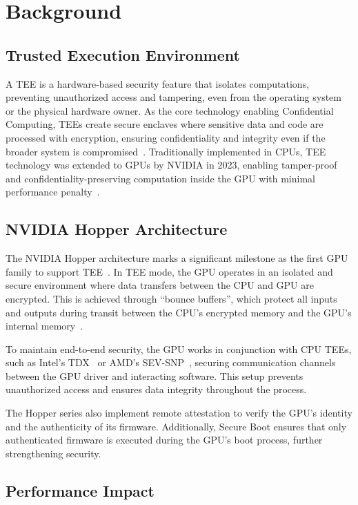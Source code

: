 \documentclass{article}
\begin{document}
\section{Background}

\subsection{Trusted Execution Environment}

A TEE is a hardware-based security feature that isolates computations, preventing unauthorized access and tampering, even from the operating system or the physical hardware owner. As the core technology enabling Confidential Computing, TEEs create secure enclaves where sensitive data and code are processed with encryption, ensuring confidentiality and integrity even if the broader system is compromised~\cite{sabt2015trusted}. Traditionally implemented in CPUs, TEE technology was extended to GPUs by NVIDIA in 2023, enabling tamper-proof and confidentiality-preserving computation inside the GPU with minimal performance penalty~\cite{dhanuskodi2023creating}.

\subsection{NVIDIA Hopper Architecture}

The NVIDIA Hopper architecture marks a significant milestone as the first GPU family to support TEE~\cite{nvidiacc}. In TEE mode, the GPU operates in an isolated and secure environment where data transfers between the CPU and GPU are encrypted. This is achieved through ``bounce buffers'', which protect all inputs and outputs during transit between the CPU’s encrypted memory and the GPU’s internal memory~\cite{dhanuskodi2023creating}.

To maintain end-to-end security, the GPU works in conjunction with CPU TEEs, such as Intel’s TDX~\cite{TDX} or AMD’s SEV-SNP~\cite{SEV-SNP, sev2020strengthening}, securing communication channels between the GPU driver and interacting software. This setup prevents unauthorized access and ensures data integrity throughout the process.

The Hopper series also implement remote attestation to verify the GPU’s identity and the authenticity of its firmware. Additionally, Secure Boot ensures that only authenticated firmware is executed during the GPU’s boot process, further strengthening security.

\subsection{Performance Impact}
\end{document}
